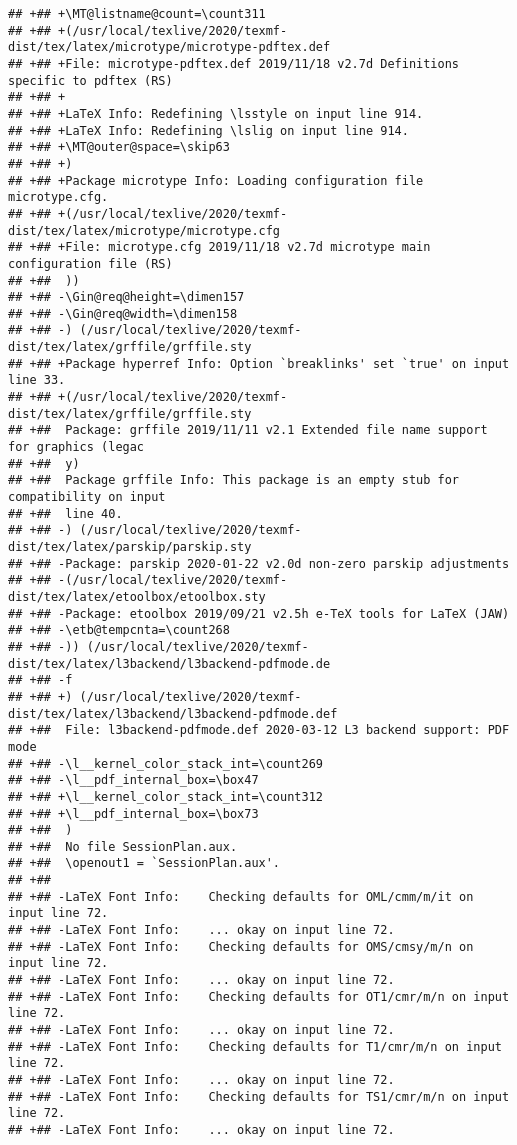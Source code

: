 \documentclass[ignorenonframetext,]{beamer}
\begin{document}
\begin{verbatim}
## +## +\MT@listname@count=\count311
## +## +(/usr/local/texlive/2020/texmf-dist/tex/latex/microtype/microtype-pdftex.def
## +## +File: microtype-pdftex.def 2019/11/18 v2.7d Definitions specific to pdftex (RS)
## +## +
## +## +LaTeX Info: Redefining \lsstyle on input line 914.
## +## +LaTeX Info: Redefining \lslig on input line 914.
## +## +\MT@outer@space=\skip63
## +## +)
## +## +Package microtype Info: Loading configuration file microtype.cfg.
## +## +(/usr/local/texlive/2020/texmf-dist/tex/latex/microtype/microtype.cfg
## +## +File: microtype.cfg 2019/11/18 v2.7d microtype main configuration file (RS)
## +##  ))
## +## -\Gin@req@height=\dimen157
## +## -\Gin@req@width=\dimen158
## +## -) (/usr/local/texlive/2020/texmf-dist/tex/latex/grffile/grffile.sty
## +## +Package hyperref Info: Option `breaklinks' set `true' on input line 33.
## +## +(/usr/local/texlive/2020/texmf-dist/tex/latex/grffile/grffile.sty
## +##  Package: grffile 2019/11/11 v2.1 Extended file name support for graphics (legac
## +##  y)
## +##  Package grffile Info: This package is an empty stub for compatibility on input 
## +##  line 40.
## +## -) (/usr/local/texlive/2020/texmf-dist/tex/latex/parskip/parskip.sty
## +## -Package: parskip 2020-01-22 v2.0d non-zero parskip adjustments
## +## -(/usr/local/texlive/2020/texmf-dist/tex/latex/etoolbox/etoolbox.sty
## +## -Package: etoolbox 2019/09/21 v2.5h e-TeX tools for LaTeX (JAW)
## +## -\etb@tempcnta=\count268
## +## -)) (/usr/local/texlive/2020/texmf-dist/tex/latex/l3backend/l3backend-pdfmode.de
## +## -f
## +## +) (/usr/local/texlive/2020/texmf-dist/tex/latex/l3backend/l3backend-pdfmode.def
## +##  File: l3backend-pdfmode.def 2020-03-12 L3 backend support: PDF mode
## +## -\l__kernel_color_stack_int=\count269
## +## -\l__pdf_internal_box=\box47
## +## +\l__kernel_color_stack_int=\count312
## +## +\l__pdf_internal_box=\box73
## +##  )
## +##  No file SessionPlan.aux.
## +##  \openout1 = `SessionPlan.aux'.
## +##  
## +## -LaTeX Font Info:    Checking defaults for OML/cmm/m/it on input line 72.
## +## -LaTeX Font Info:    ... okay on input line 72.
## +## -LaTeX Font Info:    Checking defaults for OMS/cmsy/m/n on input line 72.
## +## -LaTeX Font Info:    ... okay on input line 72.
## +## -LaTeX Font Info:    Checking defaults for OT1/cmr/m/n on input line 72.
## +## -LaTeX Font Info:    ... okay on input line 72.
## +## -LaTeX Font Info:    Checking defaults for T1/cmr/m/n on input line 72.
## +## -LaTeX Font Info:    ... okay on input line 72.
## +## -LaTeX Font Info:    Checking defaults for TS1/cmr/m/n on input line 72.
## +## -LaTeX Font Info:    ... okay on input line 72.

\end{verbatim}
\end{document}
